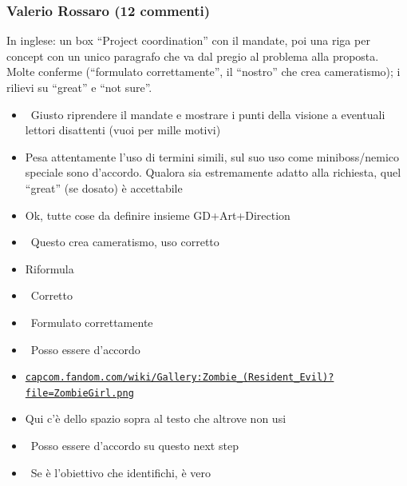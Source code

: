 \subsubsection{Valerio Rossaro (12 commenti)}
In inglese: un box ``Project coordination'' con il mandate, poi una riga per concept con un unico paragrafo che va dal pregio al problema alla proposta. Molte conferme (``formulato correttamente'', il ``nostro'' che crea cameratismo); i rilievi su ``great'' e ``not sure''.
{\small
\begin{itemize}
  \item {} \rvBene\ Giusto riprendere il mandate e mostrare i punti della visione a eventuali lettori disattenti (vuoi per mille motivi)
  \item {} Pesa attentamente l'uso di termini simili, sul suo uso come miniboss/nemico speciale sono d'accordo. Qualora sia estremamente adatto alla richiesta, quel ``great'' (se dosato) è accettabile
  \item {} Ok, tutte cose da definire insieme GD+Art+Direction
  \item {} \rvBene\ Questo crea cameratismo, uso corretto
  \item {} Riformula
  \item {} \rvBene\ Corretto
  \item {} \rvBene\ Formulato correttamente
  \item {} \rvBene\ Posso essere d'accordo
  \item {} \href{https://capcom.fandom.com/wiki/Gallery:Zombie_(Resident_Evil)?file=ZombieGirl.png}{\texttt{capcom.fandom.com/\allowbreak wiki/\allowbreak Gallery:\allowbreak Zombie\_(Resident\_Evil)?\allowbreak file=\allowbreak ZombieGirl.png}}
  \item {} Qui c'è dello spazio sopra al testo che altrove non usi
  \item {} \rvBene\ Posso essere d'accordo su questo next step
  \item {} \rvBene\ Se è l'obiettivo che identifichi, è vero
\end{itemize}
}

